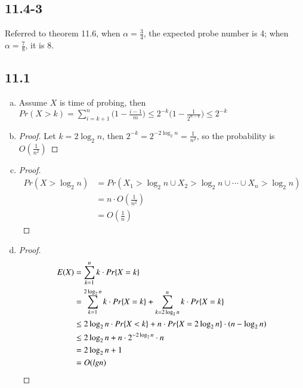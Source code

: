 \documentclass{article}
\begin{document}
\subsection*{11.4-3}
Referred to theorem 11.6, when $\alpha=\frac{3}{4}$, the expected probe number is 4; when $\alpha=\frac{7}{8}$, it is 8.
\subsection*{11.1}
\begin{enumerate}[a.]
\item Assume $X$ is time of probing, then $Pr(X>k)=\sum_{i=k+1}^{n}\big(1-\frac{i-1}{m}\big)\leq 2^{-k}\big(1-\frac{1}{2^{n-k}}\big)\leq 2^{-k}$\\
\item \begin{proof}
Let $k=2\log_2{n}$, then $2^{-k}=2^{-2\log_2{n}}=\frac{1}{n^2}$, so the probability is $O(\frac{1}{n^2})$
\end{proof}
\item \begin{proof}
\begin{equation*}
\begin{aligned}
Pr(X>\log_{2}{n})&=Pr(X_1>\log_{2}{n}\cup X_2>\log_{2}{n}\cup \cdots \cup X_n>\log_{2}{n})\\
&=n\cdot O({\frac{1}{n^2}})\\
&=O({\frac{1}{n}})
\end{aligned}
\end{equation*}
\end{proof}
\item \begin{proof}
\begin{equation*}
\begin{aligned}
E(X)&=\sum_{k=1}^{n}k\cdot Pr\{X=k\}\\
&=\sum_{k=1}^{2\log_2{n}}k\cdot Pr\{X=k\}+\sum_{k=2\log_2{n}}^{n}{k\cdot Pr\{X=k\}}\\
&\leq 2\log_2{n}\cdot Pr\{X<k\}+n\cdot Pr\{X=2\log_2{n}\}\cdot (n-\log_2{n})\\
&\leq 2\log_2{n}+n\cdot 2^{-2\log_2{n}}\cdot n\\
&=2\log_2{n}+1\\
&=O(\emph{lg}n)
\end{aligned}
\end{equation*}
\end{proof}
\end{enumerate}
\end{document}
